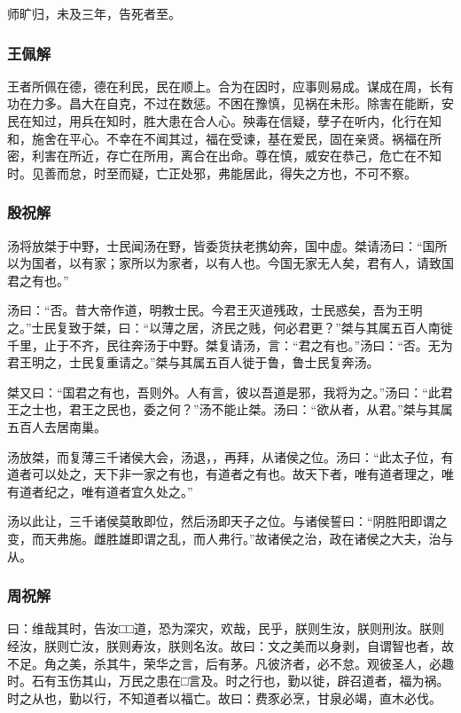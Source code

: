 \documentclass[]{article}
\begin{document}
师旷归，未及三年，告死者至。

\hypertarget{header-n355}{%
\subsubsection{王佩解}\label{header-n355}}

王者所佩在德，德在利民，民在顺上。合为在因时，应事则易成。谋成在周，长有功在力多。昌大在自克，不过在数惩。不困在豫慎，见祸在未形。除害在能断，安民在知过，用兵在知时，胜大患在合人心。殃毒在信疑，孽子在听内，化行在知和，施舍在平心。不幸在不闻其过，福在受谏，基在爱民，固在亲贤。祸福在所密，利害在所近，存亡在所用，离合在出命。尊在慎，威安在恭己，危亡在不知时。见善而怠，时至而疑，亡正处邪，弗能居此，得失之方也，不可不察。

\hypertarget{header-n359}{%
\subsubsection{殷祝解}\label{header-n359}}

汤将放桀于中野，士民闻汤在野，皆委货扶老携幼奔，国中虚。桀请汤曰：``国所以为国者，以有家；家所以为家者，以有人也。今国无家无人矣，君有人，请致国君之有也。''

汤曰：``否。昔大帝作道，明教士民。今君王灭道残政，士民惑矣，吾为王明之。''士民复致于桀，曰：``以薄之居，济民之贱，何必君更？''桀与其属五百人南徙千里，止于不齐，民往奔汤于中野。桀复请汤，言：``君之有也。''汤曰：``否。无为君王明之，士民复重请之。''桀与其属五百人徙于鲁，鲁士民复奔汤。

桀又曰：``国君之有也，吾则外。人有言，彼以吾道是邪，我将为之。''汤曰：``此君王之士也，君王之民也，委之何？''汤不能止桀。汤曰：``欲从者，从君。''桀与其属五百人去居南巢。

汤放桀，而复薄三千诸侯大会，汤退，，再拜，从诸侯之位。汤曰：``此太子位，有道者可以处之，天下非一家之有也，有道者之有也。故天下者，唯有道者理之，唯有道者纪之，唯有道者宜久处之。''

汤以此让，三千诸侯莫敢即位，然后汤即天子之位。与诸侯誓曰：``阴胜阳即谓之变，而天弗施。雌胜雄即谓之乱，而人弗行。''故诸侯之治，政在诸侯之大夫，治与从。

\hypertarget{header-n363}{%
\subsubsection{周祝解}\label{header-n363}}

曰：维哉其时，告汝□□道，恐为深灾，欢哉，民乎，朕则生汝，朕则刑汝。朕则经汝，朕则亡汝，朕则寿汝，朕则名汝。故曰：文之美而以身剥，自谓智也者，故不足。角之美，杀其牛，荣华之言，后有茅。凡彼济者，必不怠。观彼圣人，必趣时。石有玉伤其山，万民之患在□言及。时之行也，勤以徙，辟召道者，福为祸。时之从也，勤以行，不知道者以福亡。故曰：费豕必烹，甘泉必竭，直木必伐。
\end{document}
